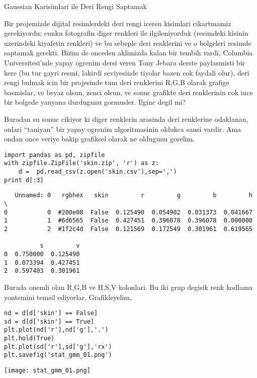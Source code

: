 \documentclass[12pt,fleqn]{article}\usepackage{../common}
\begin{document}
Gaussian Karisimlari ile Deri Rengi Saptamak

Bir projemizde dijital resimlerdeki deri rengi iceren kisimlari cikartmamiz
gerekiyordu; cunku fotografin diger renkleri ile ilgileniyorduk (resimdeki
kisinin uzerindeki kiyafetin renkleri) ve bu sebeple deri renklerini ve o
bolgeleri resimde saptamak gerekti. Bizim de onceden aklimizda kalan bir
tembih vardi, Columbia Universitesi'nde yapay ogrenim dersi veren Tony
Jebara derste paylasmisti bir kere (bu tur gayri resmi, lakirdi seviyesinde
tiyolar bazen cok faydali olur), deri rengi bulmak icin bir projesinde tum
deri renklerini R,G,B olarak grafige basmislar, ve beyaz olsun, zenci
olsun, ve sonuc grafikte deri renklerinin cok ince bir bolgede yanyana
durdugunu gormusler. Ilginc degil mi?

Buradan su sonuc cikiyor ki diger renklerin arasinda deri renklerine
odaklanan, onlari ``taniyan'' bir yapay ogrenim algoritmasinin oldukca
sansi vardir. Ama ondan once veriye bakip grafiksel olarak ne oldugunu
gorelim. 

\begin{verbatim}
import pandas as pd, zipfile
with zipfile.ZipFile('skin.zip', 'r') as z:
    d =  pd.read_csv(z.open('skin.csv'),sep=',')
print d[:3]
\end{verbatim}

\begin{verbatim}
   Unnamed: 0   rgbhex   skin         r         g         b         h  \
0           0  #200e08  False  0.125490  0.054902  0.031373  0.041667   
1           1  #6d6565  False  0.427451  0.396078  0.396078  0.000000   
2           2  #1f2c4d  False  0.121569  0.172549  0.301961  0.619565   

          s         v  
0  0.750000  0.125490  
1  0.073394  0.427451  
2  0.597403  0.301961  
\end{verbatim}

Burada onemli olan R,G,B ve H,S,V kolonlari. Bu iki grup degisik renk
kodlama yontemini temsil ediyorlar. Grafikleyelim,

\begin{verbatim}
nd = d[d['skin'] == False]
sd = d[d['skin'] == True]
plt.plot(nd['r'],nd['g'],'.')
plt.hold(True)
plt.plot(sd['r'],sd['g'],'rx')
plt.savefig('stat_gmm_01.png')
\end{verbatim}


\texttt{[image: stat\_gmm\_01.png]}
\end{document}
